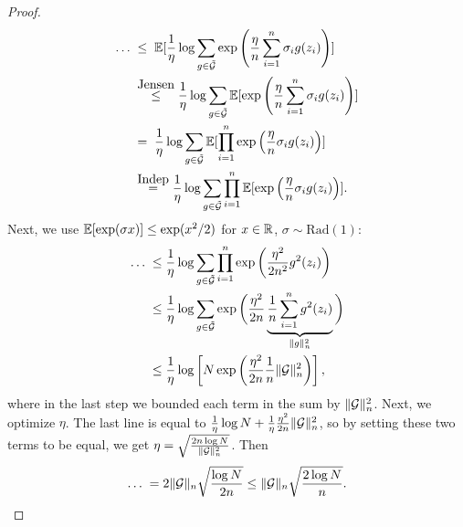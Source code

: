 \documentclass[twoside]{article}
\newcommand{\Rad}{\mathrm{Rad}}
\begin{document}
\begin{proof}
\begin{align*}
    \dotsc \; & \leq \; \mathbb{E}[ \frac1\eta \log \sum_{g \in \tilde{\mathcal{G}}} \exp \left( \frac{\eta}{n} \sum_{i=1}^n \sigma_i g(z_i) \right) ] \\
        & \stackrel{{\normalfont\mbox{Jensen}}}{ \leq } 
         \frac1\eta \log \sum_{g \in \tilde{\mathcal{G}}} \mathbb{E}[ \exp \left( \frac{\eta}{n} \sum_{i=1}^n \sigma_i g(z_i) \right) ]   \\
        \; & = \; \frac1\eta \log \sum_{g \in \tilde{\mathcal{G}}} \mathbb{E}[ \prod_{i=1}^n \exp \left( \frac{\eta}{n} \sigma_i g(z_i) \right) ]  \\
        & \stackrel{{\normalfont\mbox{Indep}}}{ = }  \frac1\eta \log \sum_{g \in \tilde{\mathcal{G}}} \prod_{i=1}^n \mathbb{E}[  \exp \left( \frac{\eta}{n} \sigma_i g(z_i) \right) ].  \\
\end{align*}
Next, we use  $\mathbb{E}[\exp(\sigma x)] \leq \exp(x^2 / 2)$ for $x \in \mathbb{R}$, $\sigma \sim \Rad(1)$:
\begin{align*}
    \dotsc \; 
        &  \leq \frac1\eta \log \sum_{g \in \tilde{\mathcal{G}}} \prod_{i=1}^n   \exp \left( \frac{\eta^2}{2n^2} g^2(z_i) \right)   \\
        &  \leq \frac1\eta \log \sum_{g \in \tilde{\mathcal{G}}}  \exp \bigg( \frac{\eta^2}{2n} \underbrace{\frac1n \sum_{i=1}^n g^2(z_i) }_{\| g \|_n^2} \bigg)  \\
        &  \leq \frac1\eta \log \left[ N  \exp \bigg( \frac{\eta^2}{2n} \frac1n \|\mathcal{G}\|_n^2  \bigg) \right],
\end{align*}
where in the last step we bounded each term in the sum by $\|\mathcal{G}\|_n^2$. Next, we optimize $\eta$. The last line is equal to $\frac1\eta \log N + \frac1\eta \frac{\eta^2}{2n} \|\mathcal{G}\|_n^2 $, so by setting these two terms to be equal, we get $\eta = \sqrt{\frac{2n \log N }{\|\mathcal{G}\|_n^2 }}$. Then
\begin{equation*}
    \dotsc \; = 2 \|\mathcal{G}\|_n \sqrt{\frac{\log N }{2n }} 
          \leq  \|\mathcal{G}\|_n \sqrt{\frac{2 \log N }{n }}.  \qedhere
\end{equation*}
\end{proof}
\end{document}
